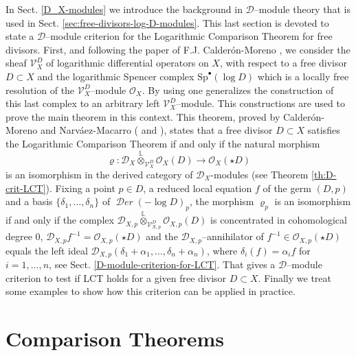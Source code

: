 \documentclass[12pt]{article}
\newcommand{\Lotimes}{\stackrel{\mathbb{L}}{\otimes}}
\DeclareMathOperator{\fDer}{\mathcal{D}\mathit{er}}
\newcommand{\OO}{\mathcal{O}}
\newcommand{\DD}{\mathcal{D}}
\newcommand{\VV}{\mathcal{V}}
\newcommand{\Sp}{{\mathrm{Sp}}}
\newcommand{\cD}{\DD}
\newcommand{\cO}{\OO}
\begin{document}
In Sect. \ref{D_X-modules} we introduce the background in $\cD$--module theory that is used in Sect. \ref{sec:free-divisors-log-D-modules}. This last section is devoted to state a $\cD$--module criterion for the Logarithmic Comparison Theorem for free divisors. First, and following the paper of F.J. Calderón-Moreno \cite{calde_ens}, we consider the sheaf $ \VV_X^D$ of logarithmic differential operators on $X$, with respect to a free divisor $D\subset X$ and the logarithmic Spencer complex $\Sp^\bullet(\log D)$ which is a locally free resolution of the $\VV_X^D$--module $\cO_X$. By using \cite{calde_nar_fourier} one generalizes the construction of this last complex to an arbitrary left $\VV_X^D$--module. This constructions are used to prove the main theorem in this context. This theorem, proved by  Calderón-Moreno and Narváez-Macarro (\cite[Cor. 4.2]{calde_nar_fourier} and \cite[Corollary 1.7.2]{nar_comp_08}), states that a free divisor $D\subset X$ satisfies the Logarithmic Comparison Theorem if and only if the natural morphism
$$ \varrho:\DD_X \Lotimes_{\VV_X^D} \OO_X(D) \longrightarrow \OO_X(\star D)
$$ is an isomorphism in the derived category of $\cD_X$-modules (see Theorem \ref{th:D-crit-LCT}). Fixing a point $p\in D$, a reduced local equation $f$ of the germ $(D,p)$ and a basis $\{\delta_1,\ldots,\delta_n\}$ of $\fDer(-\log D)_p$, the morphism $\varrho_p$ is an isomorphism if and only if the complex
$\DD_{X,p} \Lotimes_{\VV_{X,p}^D} \OO_{X,p}(D)$ is concentrated in cohomological degree 0, $\cD_{X,p}f^{-1} = \cO_{X,p}(\star D)$  and the $\cD_{X,p}$--annihilator of $f^{-1}\in \cO_{X,p}(\star D)$ equals the left ideal $\cD_{X,p}(\delta_1+\alpha_1,\ldots,\delta_n+\alpha_n)$, where $\delta_i(f)=\alpha_i f$ for $i=1,\ldots, n$, see Sect. \ref{D-module-criterion-for-LCT}.  That gives a $\cD$--module criterion to test if LCT holds for a given free divisor $D\subset X$. Finally we treat some examples to show how this criterion can be applied in practice.


\section{Comparison Theorems}\label{compare}
\end{document}
